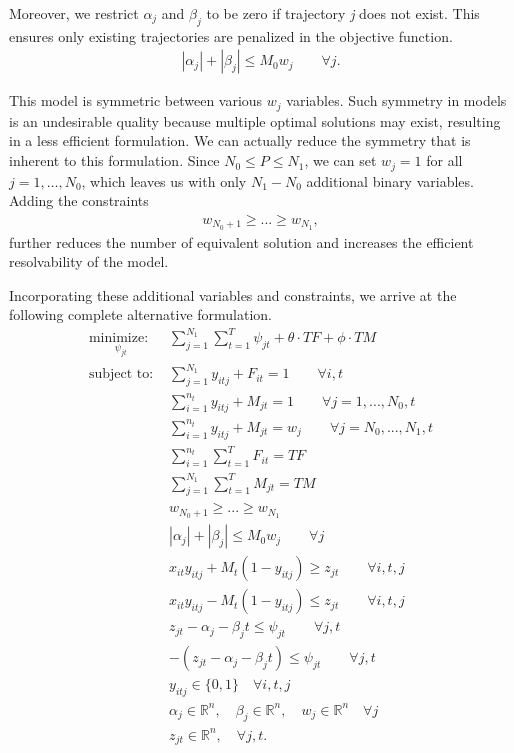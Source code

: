 Moreover, we restrict $\alpha_{j}$ and $\beta_{j}$ to be zero if trajectory \textit{j} does not exist. This ensures only existing trajectories are penalized in the objective function. 
\begin{align*}
|\alpha_{j}|+|\beta_{j}| \leq M_{0}w_{j}\qquad \forall j.
\end{align*}

This model is symmetric between various $w_j$ variables. Such symmetry in models is an undesirable quality because multiple optimal solutions may exist, resulting in a less efficient formulation. We can actually reduce the symmetry that is inherent to this formulation. Since $N_{0} \leq P \leq N_{1}$, we can set $w_j=1$ for all $j=1,\ldots,N_0$, which leaves us with only $N_1-N_0$ additional binary variables. Adding the constraints
\begin{align*}
w_{N_0+1}\geq ...\geq w_{N_1},
\end{align*}
further reduces the number of equivalent solution and increases the efficient resolvability of the model. 

Incorporating these additional variables and constraints, we arrive at the following complete alternative formulation.
\begin{align}\label{eq:MIO_decisions}
\underset{\psi_{jt}}{\text{minimize: }} & \sum_{j=1}^{N_{1}} \sum_{t=1}^{T} \psi_{jt} + \theta \cdot TF + \phi \cdot TM\\
\text{subject to: }	& \sum_{j=1}^{N_{1}} y_{itj} + F_{it} = 1 \qquad \forall i,t \nonumber\\
				& \sum_{i=1}^{n_{t}} y_{itj} + M_{jt} = 1 \qquad \forall j=1,...,N_{0},t \nonumber \\
				& \sum_{i=1}^{n_{t}} y_{itj} + M_{jt} = w_{j} \qquad \forall j=N_{0},...,N_{1},t \nonumber \\
				& \sum_{i=1}^{n_{t}} \sum_{t=1}^{T} F_{it} = TF \nonumber \\
				& \sum_{j=1}^{N_{1}} \sum_{t=1}^{T} M_{jt} = TM \nonumber \\
				& w_{N_0+1}\geq ...\geq w_{N_1} \nonumber \\
				& |\alpha_{j}|+|\beta_{j}| \leq M_{0}w_{j}\qquad \forall j \nonumber \\
				& x_{it}y_{itj} + M_{t}(1-y_{itj}) \geq z_{jt} \qquad \forall i,t,j \nonumber \\
				& x_{it}y_{itj} - M_{t}(1-y_{itj}) \leq z_{jt} \qquad \forall i,t,j \nonumber \\
				& z_{jt} - \alpha_{j} - \beta_{j}t \leq \psi_{jt} \qquad \forall j,t \nonumber \\
				& -(z_{jt} - \alpha_{j} - \beta_{j}t) \leq \psi_{jt} \qquad \forall j,t \nonumber \\
			 	& y_{itj} \in \{0,1\} \quad \forall i,t,j \nonumber \\
				& \alpha_{j} \in \mathbb{R}^n,\quad \beta_{j} \in \mathbb{R}^n,\quad w_{j} \in \mathbb{R}^n \quad \forall j \nonumber \\
				& z_{jt} \in \mathbb{R}^n, \quad \forall j,t. \nonumber
\end{align}

